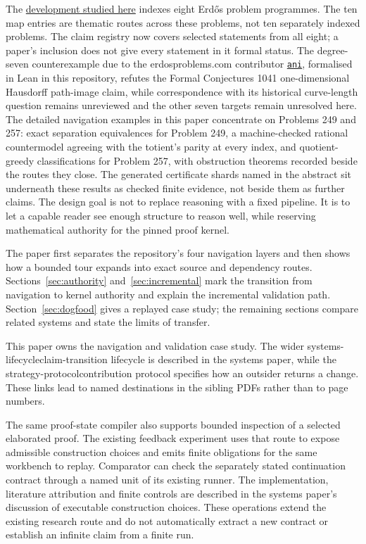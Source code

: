 \documentclass[11pt]{article}
\newcommand{\repobase}{https://github.com/wcook04/plectis-erdos}
\begin{document}
The \href{\repobase}{development studied here} indexes eight Erd\H{o}s
problem programmes. The ten map entries are thematic routes across these
problems, not ten separately indexed problems. The claim registry now covers
selected statements from all eight; a paper's inclusion does not give every
statement in it formal
status. The degree-seven counterexample due to the erdosproblems.com
contributor
\href{https://www.erdosproblems.com/forum/thread/1041\#post-8861}{\texttt{ani}},
formalised in Lean in this repository, refutes the Formal Conjectures 1041
one-dimensional Hausdorff path-image claim, while correspondence with its
historical curve-length question remains unreviewed and the other seven
targets remain unresolved here.
The detailed navigation examples in this paper concentrate on Problems 249
and 257: exact
separation equivalences for Problem 249, a machine-checked rational
countermodel agreeing with the totient's parity at every index, and
quotient-greedy classifications for Problem 257, with obstruction theorems
recorded beside the routes they close. The generated certificate shards named
in the abstract sit underneath these results as checked finite evidence, not
beside them as further claims. The design goal is not
to replace reasoning with a fixed pipeline. It is to let a capable reader see
enough structure to reason well, while reserving mathematical authority for
the pinned proof kernel.

The paper first separates the repository's four navigation layers and then
shows how a bounded tour expands into exact source and dependency routes.
Sections~\ref{sec:authority} and~\ref{sec:incremental} mark the transition from
navigation to kernel authority and explain the incremental validation path.
Section~\ref{sec:dogfood} gives a replayed case study; the remaining sections
compare related systems and state the limits of transfer.

This paper owns the navigation and validation case study. The wider
%
{systems-lifecycle}{claim-transition lifecycle} is described in the systems
paper, while the
%
{strategy-protocol}{contribution protocol} specifies how an outsider returns a
change. These links lead to named destinations in the sibling PDFs rather than
to page numbers.

The same proof-state compiler also supports bounded inspection of a selected
elaborated proof. The existing feedback experiment uses that route to expose
admissible construction choices and emits finite obligations for the same
workbench to replay. Comparator can check the separately stated continuation
contract through a named unit of its existing runner. The implementation,
literature attribution and finite controls are described in the systems
paper's discussion of executable construction choices. These operations
extend the existing research route and do not automatically extract a new
contract or establish an infinite claim from a finite run.
\end{document}
